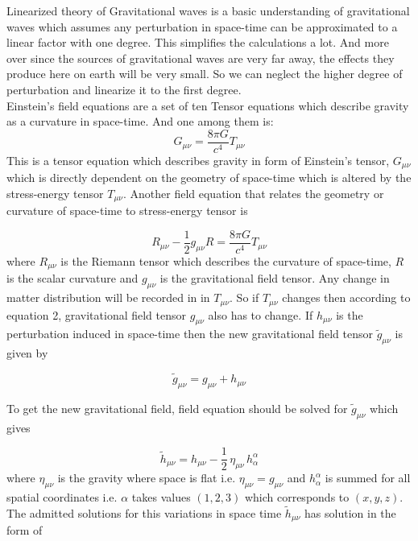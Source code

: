 Linearized theory of Gravitational waves is a basic understanding of gravitational waves which assumes any perturbation in space-time can be approximated to a linear factor with one degree. This simplifies the calculations a lot. And more over since the sources of gravitational waves are very far away, the effects they produce here on earth will be very small. So we can neglect the higher degree of perturbation and linearize it to the first degree. \\

Einstein's field equations are a set of ten Tensor equations which describe gravity as a curvature in space-time. And one among them is: 
\begin{equation}
    G_{\mu\nu}= \frac{8 \pi  G}{c^{4}}  T_{\mu\nu}
\end{equation}
This is a tensor equation which describes gravity in form of Einstein's tensor, $G_{\mu\nu}$ which is directly dependent on the geometry of space-time which is altered by the stress-energy tensor $T_{\mu\nu}$. Another field equation that relates the geometry or curvature of space-time to stress-energy tensor is 

\begin{equation}
    R_{\mu\nu}-\frac{1}{2}g_{\mu\nu}R=\frac{8\pi G}{c^{4}}T_{\mu\nu}
\end{equation}
where $R_{\mu\nu}$ is the Riemann tensor which describes the curvature of space-time, $R$ is the scalar curvature and $g_{\mu\nu}$ is the gravitational field tensor. Any change in matter distribution will be recorded in in $T_{\mu\nu}$. So if $T_{\mu\nu}$ changes then according to equation 2, gravitational field tensor $g_{\mu\nu}$ also has to change. If $h_{\mu\nu}$ is the perturbation induced in space-time then the new gravitational field tensor $\tilde{g}_{\mu\nu}$ is given by 

\begin{equation}
    \tilde{g}_{\mu\nu} = g_{\mu\nu} + h_{\mu\nu}
\end{equation}

\noindent To get the new gravitational field, field equation should be solved for $\tilde{g}_{\mu\nu}$ which gives 

\begin{equation}
    \tilde{h}_{\mu\nu} = h_{\mu\nu} - \frac{1}{2} \, \eta_{\mu\nu} \, h^{\alpha}_{\alpha}
\end{equation}
 where $\eta_{\mu\nu}$ is the gravity where space is flat i.e. $\eta_{\mu\nu} = g_{\mu\nu}$ and $h^{\alpha}_{\alpha}$ is summed for all spatial coordinates i.e. $\alpha$ takes values $(1,2,3) $ which corresponds to $(x,y,z)$. The admitted solutions for this variations in space time $\tilde{h}_{\mu\nu}$ has solution in the form of 
 
